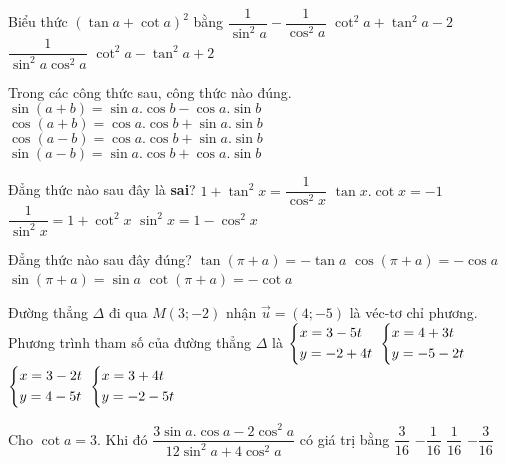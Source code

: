 \begin{ex}%
Biểu thức $(\tan a+\cot a)^2$ bằng
\choice
{$\dfrac{1}{\sin^2a}-\dfrac{1}{\cos^2a}$}
{$\cot^2a+\tan^2a-2$}
{\True $\dfrac{1}{\sin^2a\cos^2a}$}
{$\cot^2a-\tan^2a+2$}
\end{ex}
\begin{ex}%
	Trong các công thức sau, công thức nào đúng.
	\choice
	{$\sin(a+b)=\sin a.\cos b-\cos a.\sin b$}
	{$\cos (a+b)=\cos a.\cos b+\sin a.\sin b$}
	{\True $\cos (a-b)=\cos a.\cos b+\sin a.\sin b$}
	{$\sin (a-b)=\sin a.\cos b+\cos a.\sin b$}
\end{ex}
\begin{ex}%
	Đẳng thức nào sau đây là \textbf{sai}?
	\choice
	{$1+\tan^2 x=\dfrac{1}{\cos^2 x}$}
	{\True $\tan x.\cot x=-1$}
	{$\dfrac{1}{\sin^2 x}=1+\cot^2 x$}
	{$\sin^2 x=1-\cos^2 x$}
\end{ex}
\begin{ex}%
	Đẳng thức nào sau đây đúng?
	\choice
	{$\tan (\pi +a)=-\tan a$}
	{\True $\cos (\pi + a)=-\cos a$}
	{$\sin (\pi +a)=\sin a$}
	{$\cot (\pi +a)=-\cot a$}
\end{ex}
\begin{ex}%
	Đường thẳng $\Delta$ đi qua $M(3;-2)$ nhận $\vec{u}=(4;-5)$ là véc-tơ chỉ phương. Phương trình tham số của đường thẳng $\Delta$ là
	\choice
	{$\left\{\begin{aligned}&x=3-5t\\&y=-2+4t\end{aligned}\right.$}
	{$\left\{\begin{aligned}&x=4+3t\\&y=-5-2t\end{aligned}\right.$}
	{$\left\{\begin{aligned}&x=3-2t\\&y=4-5t\end{aligned}\right.$}
	{\True $\left\{\begin{aligned}&x=3+4t\\&y=-2-5t\end{aligned}\right.$}
\end{ex}
\begin{ex}%
	Cho $\cot a=3$. Khi đó $\dfrac{3\sin a.\cos a-2\cos^2 a}{12\sin^2 a+4\cos^2 a}$ có giá trị bằng
	\choice
	{$\dfrac{3}{16}$}
	{$-\dfrac{1}{16}$}
	{$\dfrac{1}{16}$}
	{\True $-\dfrac{3}{16}$}
\end{ex}
